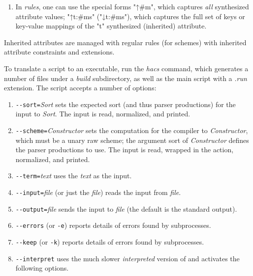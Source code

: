 \documentclass[12pt]{article} %
\begin{document}
\begin{manual}
\begin{enumerate}
  \item In \emph{rules}, one can use the special forms "↑#m", which captures \emph{all} synthesized
    attribute values; "↑t{:#ms}" ("↓t{:#ms}"), which captures the full set of keys or key-value
    mappings of the "t" synthesized (inherited) attribute.

  \end{enumerate}
  Inherited attributes are managed with regular rules (for schemes) with inherited attribute
  constraints and extensions.
\end{manual}

\begin{manual}\label{man:run}\leavevmode
  To translate a \HAX script to an executable, run the \emph{hacs} command, which generates a number
  of files under a \emph{build} subdirectory, as well as the main script with a \emph{.run}
  extension.  The script accepts a number of options:
  \begin{enumerate}

  \item \verb"--sort="\emph{Sort} sets the expected sort (and thus parser productions) for the input to
    \emph{Sort}. The input is read, normalized, and printed.

  \item \verb"--scheme="\emph{Constructor} sets the computation for the compiler to \emph{Constructor},
    which must be a unary raw scheme; the argument sort of \emph{Constructor} defines the parser
    productions to use.  The input is read, wrapped in the action, normalized, and printed.

  \item \verb"--term="\emph{text} uses the \emph{text} as the input.

  \item \verb"--input="\emph{file} (or just the \emph{file}) reads the input from \emph{file}.

  \item \verb"--output="\emph{file} sends the input to \emph{file} (the default is the standard output).

  \item \verb"--errors" (or \verb'-e') reports details of errors found by subprocesses.

  \item \verb"--keep" (or \verb'-k') reports details of errors found by subprocesses.

  \item \verb"--interpret" uses the much slower \emph{interpreted} version of \HAX and activates the
    following options.


\end{enumerate}
\end{manual}
\end{document}
